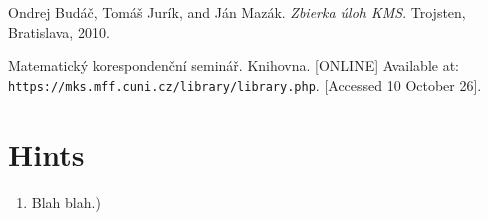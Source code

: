 \documentclass[11pt,a5paper]{article}
\begin{document}
\begin{thebibliography}{9}
 Ondrej Budáč, Tomáš Jurík, and Ján Mazák. 
	\emph{Zbierka úloh KMS}. Trojsten, Bratislava, 2010.
	
 Matematický korespondenční seminář. Knihovna. [ONLINE] Available at: \texttt{https://mks.mff.cuni.cz/library/library.php}. [Accessed 10 October 26].
\end{thebibliography}

\section{Hints}
\begin{enumerate}
	\subsection*{Easy}
	\subsection*{Medium}
	\subsection*{Difficult}
	\subsection*{Extra}	
	\item{Blah blah.)}
\end{enumerate}
\end{document}
